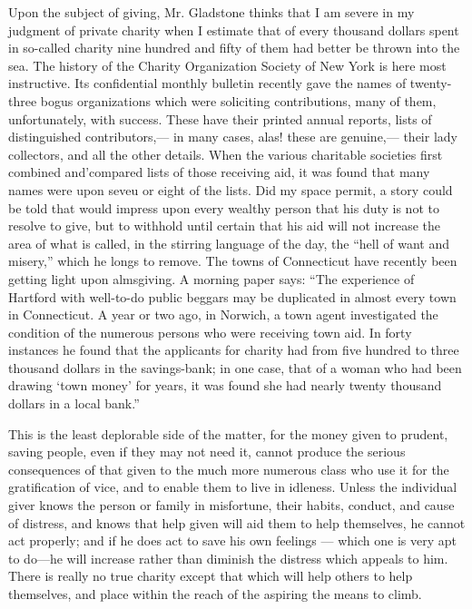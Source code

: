 \documentclass[11pt,openany]{book}
\begin{document}
Upon the subject of giving, Mr. Gladstone thinks that I am severe in my judgment of private charity when I estimate that of every thousand dollars spent in so-called charity nine hundred and fifty of them had better be thrown into the sea. The history of the Charity Organization Society of New York is here most instructive. Its confidential monthly bulletin recently gave the names of twenty-three bogus organizations which were soliciting contributions, many of them, unfortunately, with success. These have their printed annual reports, lists of distinguished contributors,--- in many cases, alas! these are genuine,--- their lady collectors, and all the other details. When the various charitable societies first combined and'compared lists of those receiving aid, it was found that many names were upon seveu or eight of the lists. Did my space permit, a story could be told that would impress upon every wealthy person that his duty is not to resolve to give, but to withhold until certain that his aid will not increase the area of what is called, in the stirring language of the day, the ``hell of want and misery,'' which he longs to remove. The towns of Connecticut have recently been getting light upon almsgiving. A morning paper says: ``The experience of Hartford with well-to-do public beggars may be duplicated in almost every town in Connecticut. A year or two ago, in Norwich, a town agent investigated the condition of the numerous persons who were receiving town aid. In forty instances he found that the applicants for charity had from five hundred to three thousand dollars in the savings-bank; in one case, that of a woman who had been drawing `town money' for years, it was found she had nearly twenty thousand dollars in a local bank.''

This is the least deplorable side of the matter, for the money given to prudent, saving people, even if they may not need it, cannot produce the serious consequences of that given to the much more numerous class who use it for the gratification of vice, and to enable them to live in idleness. Unless the individual giver knows the person or family in misfortune, their habits, conduct, and cause of distress, and knows that help given will aid them to help themselves, he cannot act properly; and if he does act to save his own feelings --- which one is very apt to do---he will increase rather than diminish the distress which appeals to him. There is really no true charity except that which will help others to help themselves, and place within the reach of the aspiring the means to climb.
\end{document}
